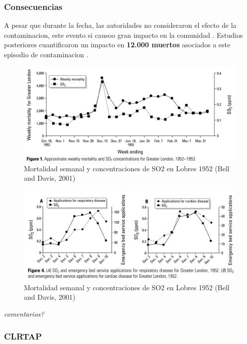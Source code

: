 \documentclass[]{book}
\begin{document}
\hypertarget{consecuencias}{%
\subsubsection{Consecuencias}\label{consecuencias}}

A pesar que durante la fecha, las autoridades no consideraron el efecto de la contaminacion, este evento si causoo gran impacto en la comunidad \citep{l1952}. Estudios posteriores cuantificaron un impacto en \textbf{12.000 muertos} asociados a este episodio de contaminacion \citep{bell2001reassessment}.

\begin{figure}
\includegraphics[width=1.2\linewidth]{figs/so2lon} \caption{Mortalidad semanal y concentraciones de SO2 en Lobres 1952 (Bell and Davis, 2001)}\label{fig:unnamed-chunk-7}
\end{figure}

\begin{figure}
\includegraphics[width=1.2\linewidth]{figs/so2lon2} \caption{Mortalidad semanal y concentraciones de SO2 en Lobres 1952 (Bell and Davis, 2001)}\label{fig:unnamed-chunk-8}
\end{figure}

\emph{comentarios?}

\hypertarget{clrtap}{%
\subsubsection{CLRTAP}\label{clrtap}}
\end{document}
